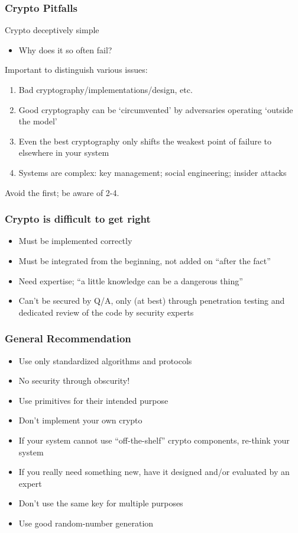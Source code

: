 \begin{frame}\frametitle{Crypto Pitfalls}
Crypto deceptively simple
\begin{itemize}
\item Why does it so often fail?
\end{itemize}
Important to distinguish various issues:
\begin{enumerate}
\item Bad cryptography/implementations/design, etc.
\item Good cryptography can be `circumvented' by adversaries operating `outside the model'
\item Even the best cryptography only shifts the weakest point of failure to elsewhere in your system
\item Systems are complex: key management; social engineering; insider attacks
\end{enumerate}
Avoid the first; be aware of 2-4.
\end{frame}
\begin{frame}\frametitle{Crypto is difficult to get right}
\begin{itemize}
\item Must be implemented correctly
\item Must be integrated from the beginning, not added on ``after the fact''
\item Need expertise; ``a little knowledge can be a dangerous thing''
\item Can't be secured by Q/A, only (at best) through penetration testing and dedicated review of the code by security experts
\end{itemize}
\end{frame}
\begin{frame}\frametitle{General Recommendation}
\begin{itemize}
\item Use only standardized algorithms and protocols
\item No security through obscurity!
\item Use primitives for their intended purpose
\item Don't implement your own crypto
\item If your system cannot use ``off-the-shelf'' crypto components, re-think your system
\item If you really need something new, have it designed and/or evaluated by an expert
\item Don't use the same key for multiple purposes
\item Use good random-number generation
\end{itemize}
\end{frame}
